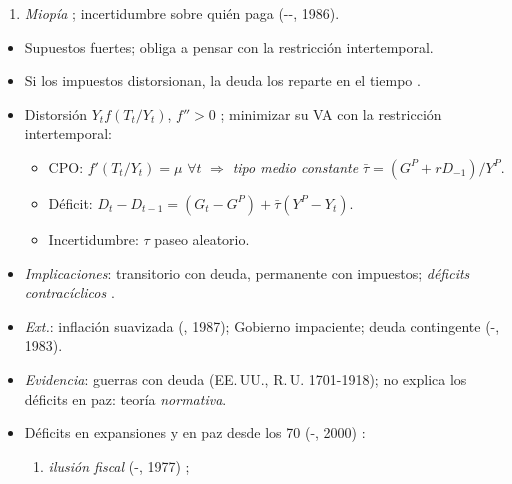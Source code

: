 \documentclass{article}
\begin{document}
\begin{columnas}
\begin{enumerate}
\begin{itemize}
  \end{itemize}
\item \emph{Miopía} ; incertidumbre sobre quién paga (--, 1986).
\end{enumerate}
\begin{itemize}
\item Supuestos fuertes; obliga a pensar con la restricción intertemporal.
\end{itemize}
\begin{itemize}
\item Si los impuestos distorsionan, la deuda los reparte en el tiempo .
\item Distorsión $Y_tf(T_t/Y_t)$, $f''>0$ ; minimizar su VA con la restricción intertemporal:
  \begin{itemize}
  \item CPO: $f'(T_t/Y_t)=\mu$ $\forall t$ $\Rightarrow$ \emph{tipo medio constante} $\bar\tau=(G^P+rD_{-1})/Y^P$.
  \item Déficit: $D_t-D_{t-1}=(G_t-G^P)+\bar\tau(Y^P-Y_t)$.
  \item Incertidumbre: $\tau$ paseo aleatorio.
  \end{itemize}
\end{itemize}
\begin{itemize}
\item \emph{Implicaciones}: transitorio con deuda, permanente con impuestos; \emph{déficits contracíclicos} .
\item \emph{Ext.}: inflación suavizada (, 1987); Gobierno impaciente; deuda contingente (-, 1983).
\item \emph{Evidencia}: guerras con deuda (EE.\,UU., R.\,U. 1701-1918); no explica los déficits en paz: teoría \emph{normativa}.
\end{itemize}
\begin{itemize}
\item Déficits en expansiones y en paz desde los 70 (-, 2000) :
  \begin{enumerate}
  \item \emph{ilusión fiscal} (-, 1977) ;

\end{enumerate}
\end{itemize}
\end{columnas}
\end{document}
